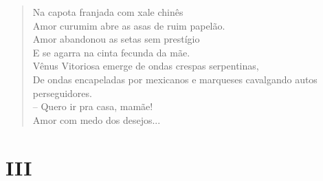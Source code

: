 \begin{verse}
Na capota franjada com xale chinês\\
Amor curumim abre as asas de ruim papelão.\\
Amor abandonou as setas sem prestígio\\
E se agarra na cinta fecunda da mãe.\\
Vênus Vitoriosa emerge de ondas crespas serpentinas,\\
De ondas encapeladas por mexicanos e marqueses cavalgando autos perseguidores.\\
-- Quero ir pra casa, mamãe!\\

Amor com medo dos desejos...
\end{verse}

\section{III}

